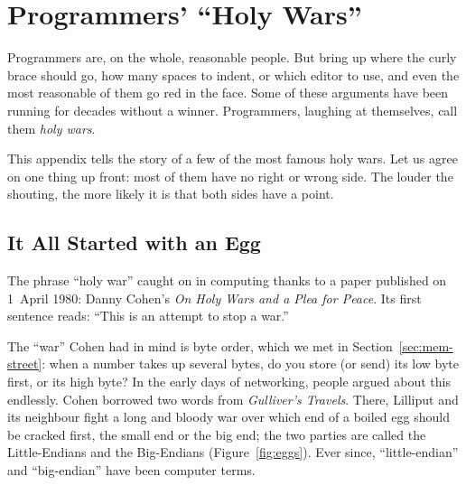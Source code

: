 \chapter{Programmers' \texorpdfstring{``Holy Wars''}{“Holy Wars”}}
\label{app:holy-wars}

Programmers are, on the whole, reasonable people. But bring up where the curly brace should go, how many spaces to indent, or which editor to use, and even the most reasonable of them go red in the face. Some of these arguments have been running for decades without a winner. Programmers, laughing at themselves, call them \emph{holy wars}.

This appendix tells the story of a few of the most famous holy wars. Let us agree on one thing up front: most of them have no right or wrong side. The louder the shouting, the more likely it is that both sides have a point.

\section{It All Started with an Egg}

The phrase ``holy war'' caught on in computing thanks to a paper published on 1~April 1980: Danny Cohen's \emph{On Holy Wars and a Plea for Peace}. Its first sentence reads: ``This is an attempt to stop a war.''

The ``war'' Cohen had in mind is byte order, which we met in Section~\ref{sec:mem-street}: when a number takes up several bytes, do you store (or send) its low byte first, or its high byte? In the early days of networking, people argued about this endlessly. Cohen borrowed two words from \emph{Gulliver's Travels}. There, Lilliput and its neighbour fight a long and bloody war over which end of a boiled egg should be cracked first, the small end or the big end; the two parties are called the Little-Endians and the Big-Endians (Figure~\ref{fig:eggs}). Ever since, ``little-endian'' and ``big-endian'' have been computer terms.

